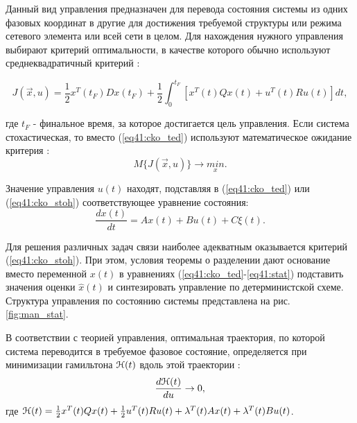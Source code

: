 Данный вид управления предназначен для перевода состояния системы из одних фазовых координат в другие для достижения требуемой структуры или режима сетевого элемента или всей сети в целом. 
Для нахождения нужного управления выбирают критерий оптимальности, в качестве которого обычно используют среднеквадратичный критерий \cite{popovski}:


\begin{equation}\label{eq41:cko_ted}
J(\vec{x},u)=\frac{1}{2}x^T(t_F)Dx(t_F)+\frac{1}{2}\int^{t_F}_0[x^T(t)Qx(t)+u^T(t)Ru(t)]dt,
\end{equation}

\noindent где $t_F$ - финальное время, за которое достигается цель управления. Если система стохастическая, то вместо (\ref{eq41:cko_ted}) используют математическое ожидание критерия \cite{popovski}:
\begin{equation}\label{eq41:cko_stoh}
M\{J(\vec{x},u)\}\rightarrow \underset{x}{min}.
\end{equation}

Значение управления $u(t)$ находят,  подставляя в (\ref{eq41:cko_ted}) или (\ref{eq41:cko_stoh}) соответствующее уравнение состояния:
\begin{equation}\label{eq41:stat}
\frac{dx(t)}{dt}=Ax(t)+Bu(t)+C\xi(t).
\end{equation}

Для решения различных задач связи наиболее адекватным оказывается критерий (\ref{eq41:cko_stoh}).
При этом, условия теоремы о разделении дают основание вместо переменной $x(t)$ в уравнениях (\ref{eq41:cko_ted}-\ref{eq41:stat}) подставить значения оценки $\hat{x}(t)$ и синтезировать управление по детерминистской схеме.
Структура управления по состоянию системы представлена на рис. \ref{fig:man_stat}.


В соответствии с теорией управления, оптимальная траектория, по которой система переводится в требуемое фазовое состояние, определяется при минимизации гамильтона $\EuScript{H}(t)$ вдоль этой траектории \cite{popovski}:
\begin{equation}\label{eq41:man1}
\frac{d\EuScript{H}(t)}{du}\rightarrow0,
\end{equation}
\noindent где $\EuScript{H}(t)=\frac{1}{2}x^T(t)Qx(t)+\frac{1}{2}u^T(t)Ru(t)+\lambda^T(t)Ax(t)+\lambda^T(t)Bu(t)$.

